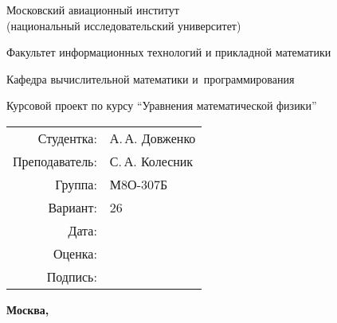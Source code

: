\begin{titlepage}
\begin{center}
\bfseries

{\Large Московский авиационный институт\\ (национальный исследовательский университет)

}

\vspace{48pt}

{\large Факультет информационных технологий и прикладной математики
}

\vspace{36pt}


{\large Кафедра вычислительной математики и~программирования

}


\vspace{48pt}

Курсовой проект по курсу \enquote{Уравнения математической физики}

\end{center}

\vspace{72pt}

\begin{flushright}
\begin{tabular}{rl}
Студентка: & А.\,А. Довженко \\
Преподаватель: & С.\,А. Колесник \\
Группа: & М8О-307Б \\
Вариант: & 26 \\
Дата: & \\
Оценка: & \\
Подпись: & \\
\end{tabular}
\end{flushright}

\vfill

\begin{center}
\bfseries
Москва, \the\year
\end{center}
\end{titlepage}
\tableofcontents
\pagebreak
